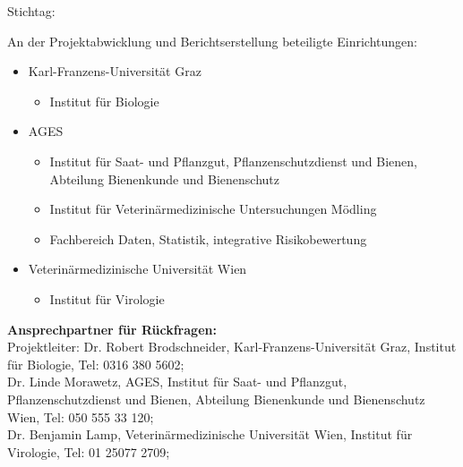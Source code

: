 \begin{center}
    \textbf{\mysubject} \par
    Stichtag: \mydeadlinedate
\end{center}

An der Projektabwicklung und Berichtserstellung beteiligte Einrichtungen:

\begin{itemize}
    \item  Karl-Franzens-Universität Graz
    \begin{itemize}
        \item  Institut für Biologie
    \end{itemize}
    \item  AGES
    \begin{itemize}
        \item  Institut für Saat- und Pflanzgut, Pflanzenschutzdienst und Bienen, Abteilung Bienenkunde und Bienenschutz
        \item Institut für Veterinärmedizinische Untersuchungen Mödling
        \item Fachbereich Daten, Statistik, integrative Risikobewertung
    \end{itemize}
    \item Veterinärmedizinische Universität Wien
    \begin{itemize}
        \item Institut für Virologie
    \end{itemize}
\end{itemize}

\vfill\vfill

\textbf{Ansprechpartner für Rückfragen:}
\\

Projektleiter: Dr. Robert Brodschneider, Karl-Franzens-Universität Graz, Institut für Biologie, Tel: 0316 380 5602; 
\\

Dr. Linde Morawetz, AGES, Institut für Saat- und Pflanzgut, Pflanzenschutzdienst und Bienen, Abteilung Bienenkunde und Bienenschutz Wien, Tel: 050 555 33 120; 
\\

Dr. Benjamin Lamp, Veterinärmedizinische Universität Wien, Institut für Virologie, Tel: 01 25077 2709; 